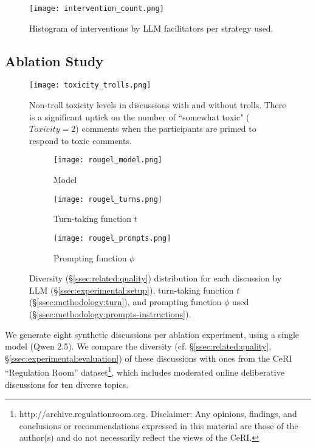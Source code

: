 \begin{figure}[t]
	\centering
	\texttt{[image: intervention\_count.png]}
	\caption{Histogram of interventions by LLM facilitators per strategy used.}
	\label{fig:intervention_count}
\end{figure}


\subsection{Ablation Study}
\label{ssec:results:ablation}

\begin{figure}[t]
	\centering
	\texttt{[image: toxicity\_trolls.png]}
	\caption{Non-troll toxicity levels in discussions with and without trolls. There is a significant uptick on the number of ``somewhat toxic" ($Toxicity=2$) comments when the participants are primed to respond to toxic comments.}
	\label{fig:toxicity_trolls}
\end{figure}

\begin{figure*}[t]
    \begin{subfigure}{0.32\linewidth}
        \texttt{[image: rougel\_model.png]}
        \caption{Model}
        \label{fig:rougel_model}
    \end{subfigure}%
    \hfill
    \begin{subfigure}{0.32\linewidth}
        \texttt{[image: rougel\_turns.png]}
        \caption{Turn-taking function $t$}
        \label{fig:rougel_turns}
    \end{subfigure}%
    \hfill
    \begin{subfigure}{0.32\linewidth}
        \texttt{[image: rougel\_prompts.png]}
        \caption{Prompting function $\phi$}
        \label{fig:rougel_prompts}
    \end{subfigure}%

    \caption{Diversity (\S\ref{ssec:related:quality}) distribution for each discussion by LLM (\S\ref{ssec:experimental:setup}), turn-taking function $t$ (\S\ref{ssec:methodology:turn}), and prompting function $\phi$ used (\S\ref{ssec:methodology:prompts-instructions}).}
    \label{fig:diversity}
\end{figure*}

We generate eight synthetic discussions per ablation experiment, using a single model (Qwen 2.5). We compare the diversity (cf. \S\ref{ssec:related:quality}, \S\ref{ssec:experimental:evaluation}) of these discussions with ones from the CeRI “Regulation Room” dataset\footnote{http://archive.regulationroom.org. Disclaimer: Any opinions, findings, and conclusions or recommendations expressed in this material are those of the author(s) and do not necessarily reflect the views of the CeRI.}, which includes moderated online deliberative discussions for ten diverse topics.


